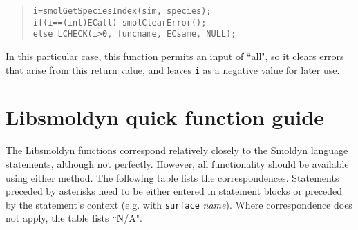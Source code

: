 \documentclass {book}
\begin{document}
\begin{quote}
\begin{lstlisting}
i=smolGetSpeciesIndex(sim, species);
if(i==(int)ECall) smolClearError();
else LCHECK(i>0, funcname, ECsame, NULL);
\end{lstlisting}
\end{quote}

In this particular case, this function permits an input of ``all", so it clears errors that arise from this return value, and leaves \texttt{i} as a negative value for later use.


\chapter{Libsmoldyn quick function guide}
The Libsmoldyn functions correspond relatively closely to the Smoldyn language statements, although not perfectly. However, all functionality should be available using either method. The following table lists the correspondences. Statements preceded by asterisks need to be either entered in statement blocks or preceded by the statement's context (e.g. with \texttt{surface} \emph{name}). Where correspondence does not apply, the table lists ``N/A".
\end{document}
